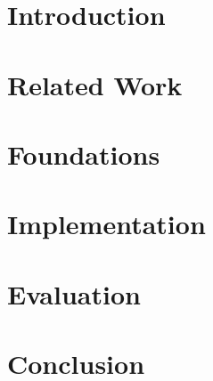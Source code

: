 \documentclass[smallcondensed]{svjour3}     %
\begin{document}
\section{Introduction}
\label{sec:introduction}


\section{Related Work}
\label{sec:related-work}


\section{Foundations}
\label{sec:foundations}

\section{Implementation}
\label{sec:implementation}


\section{Evaluation}

\section{Conclusion}


\end{document}
